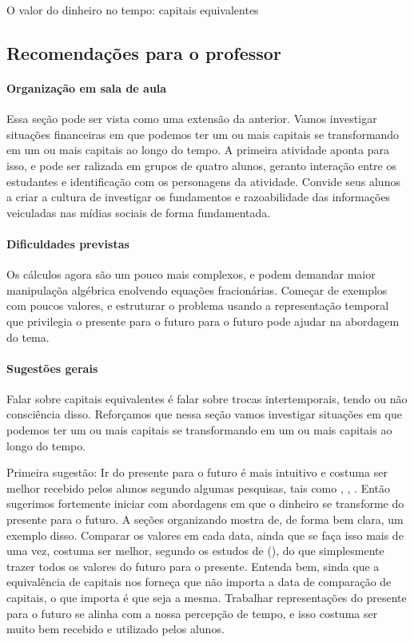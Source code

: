 \begin{paginatexto}{O valor do dinheiro no tempo: capitais equivalentes}
\subsection*{Recomendações para o professor}

\paragraph{Organização em sala de aula} Essa seção pode ser vista como uma extensão da anterior. Vamos investigar situações financeiras em que podemos ter um ou mais capitais se transformando em um ou mais capitais ao longo do tempo. A primeira atividade aponta para isso, e pode ser ralizada em grupos de quatro alunos, geranto interação entre os estudantes e identificação com os personagens da atividade. Convide seus alunos a criar a cultura de investigar os fundamentos e razoabilidade das informações veiculadas nas mídias sociais de forma fundamentada.

\paragraph{Dificuldades previstas} Os cálculos agora são um pouco mais complexos, e podem demandar maior manipulaçõa algébrica enolvendo equações fracionárias. Começar de exemplos com poucos valores, e estruturar o problema usando a representação temporal que privilegia o presente para o futuro para o futuro pode ajudar na abordagem do tema.

\paragraph{Sugestões gerais}
Falar sobre capitais equivalentes é falar sobre trocas intertemporais, tendo ou não consciência disso. Reforçamos que nessa seção vamos investigar situações em que podemos ter um ou mais capitais se transformando em um ou mais capitais ao longo do tempo.

Primeira sugestão: Ir do presente para o futuro é mais intuitivo e costuma ser melhor recebido pelos alunos segundo algumas pesquisas, tais como \cite{campos2013}, \cite{muniz2016b}, \cite{santana2019}. Então sugerimos fortemente iniciar com abordagens em que o dinheiro se transforme do presente para o futuro. A seções organizando mostra de, de forma bem clara, um exemplo disso. Comparar os valores em cada data, ainda que se faça isso mais de uma vez, costuma ser melhor, segundo os estudos de \citeauthor{muniz2016a} (\citeyear{muniz2016b}), do que simplesmente trazer todos os valores do futuro para o presente. Entenda bem, sinda que a equivalência de capitais nos forneça que não importa a data de comparação de capitais, o que importa é que seja a mesma. Trabalhar representações do presente para o futuro se alinha com a nossa percepção de tempo, e isso costuma ser muito bem recebido e utilizado pelos alunos.


\end{paginatexto}
